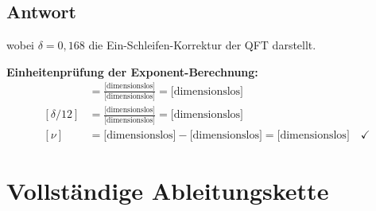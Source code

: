 \documentclass[12pt,a4paper]{article}
\newcommand{\nulep}{\nu}
\theoremstyle{remark}
\newenvironment{answer}{\subsection*{Antwort}}{\vspace{1em}}
\begin{document}
\begin{answer}
	wobei $\delta = 0{,}168$ die Ein-Schleifen-Korrektur der QFT darstellt.
	
	\begin{units}
		\textbf{Einheitenprüfung der Exponent-Berechnung:}
		\begin{align}
			[D_f/2] &= \frac{\text{[dimensionslos]}}{\text{[dimensionslos]}} = \text{[dimensionslos]} \\
			[\delta/12] &= \frac{\text{[dimensionslos]}}{\text{[dimensionslos]}} = \text{[dimensionslos]} \\
			[\nulep] &= \text{[dimensionslos]} - \text{[dimensionslos]} = \text{[dimensionslos]} \quad \checkmark
		\end{align}
	\end{units}
\end{answer}

\section{Vollständige Ableitungskette}
\end{document}
